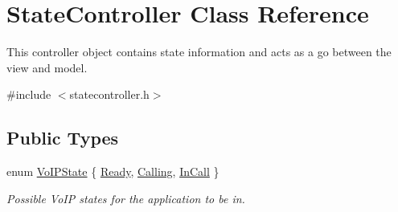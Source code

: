 \hypertarget{class_state_controller}{
\section{\-State\-Controller \-Class \-Reference}
\label{class_state_controller}
}


\-This controller object contains state information and acts as a go between the view and model.  




{\ttfamily \#include $<$statecontroller.\-h$>$}

\subsection*{\-Public \-Types}
\begin{DoxyCompactItemize}
\item 
enum \hyperlink{class_state_controller_a1aabd2155d8e6feb201ed3941e4ee2be}{\-Vo\-I\-P\-State} \{ \hyperlink{class_state_controller_a1aabd2155d8e6feb201ed3941e4ee2beaaa2246adace3ba467ba59ca67820f4cc}{\-Ready}, 
\hyperlink{class_state_controller_a1aabd2155d8e6feb201ed3941e4ee2beae99363dcdf7f911223e5e75d348832d4}{\-Calling}, 
\hyperlink{class_state_controller_a1aabd2155d8e6feb201ed3941e4ee2beadee615ec66e7823e546668a00c857c13}{\-In\-Call}
 \}
\begin{DoxyCompactList}\small\item\em \-Possible \-Vo\-I\-P states for the application to be in. \end{DoxyCompactList}\end{DoxyCompactItemize}
